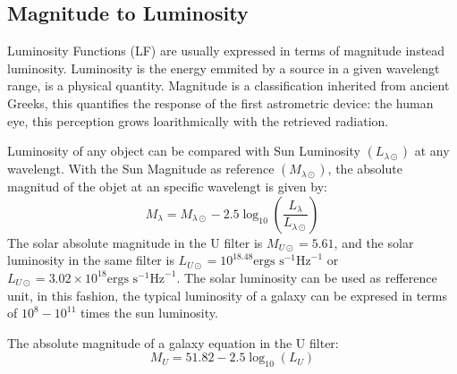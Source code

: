 \subsection{Magnitude to Luminosity}

Luminosity Functions (LF) are usually expressed in terms of magnitude instead 
luminosity. Luminosity is the energy emmited by a source in a given wavelengt range, 
is a physical quantity. 
Magnitude is a classification inherited from ancient Greeks, this
quantifies the response of the first astrometric device: the human eye, this
perception grows loarithmically with the retrieved radiation.

Luminosity of any object can be compared with Sun Luminosity $(L_{\lambda
\odot})$ at any wavelengt. With the Sun Magnitude as reference
$(M_{\lambda \odot})$, the absolute magnitud of the objet  at an specific
wavelengt is given by: 
 \[ M_{\lambda} = M_{\lambda \odot} - 2.5 \log_{10}\left( 
\frac{L_\lambda}{L_{\lambda \odot}} \right) \]
  The solar absolute magnitude in the U filter is $M_{U\odot} = 5.61$,
and the solar luminosity in the same filter is $L_{U\odot} = 10^{18.48} 
\textrm{ergs s}^{-1}\textrm{Hz}^{-1}$ or $ L_{U\odot} = 3.02 \times 10^{18} 
\textrm{ergs s}^{-1}\textrm{Hz}^{-1}$. The solar luminosity can be used as
refference unit, in this fashion, the typical luminosity of a galaxy can be expresed in
terms of $10^{8}-10^{11}$ times the sun luminosity.

  The absolute magnitude of a galaxy equation in the U filter:
  \[ M_{U} = 51.82 - 2.5 \log_{10}(L_{U}) \]

